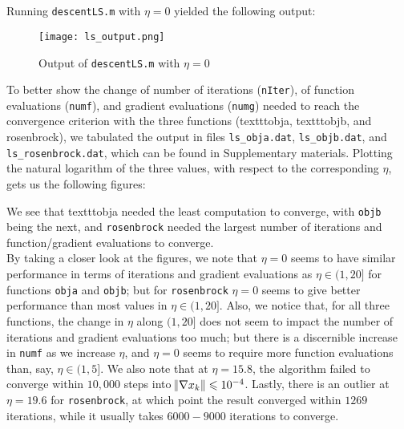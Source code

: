 \documentclass[11pt]{article}
\begin{document}
\section{}
Running \texttt{descentLS.m} with $\eta = 0$ yielded the following output:
\begin{figure}[h]
\centering
{\texttt{[image: ls\_output.png]}
\caption{Output of \texttt{descentLS.m} with $\eta=0$}}
\end{figure}
To better show the change of number of iterations (\texttt{nIter}), of function evaluations (\texttt{numf}), and gradient evaluations (\texttt{numg}) needed to reach the convergence criterion with the three functions (texttt{obja}, texttt{objb}, and {rosenbrock}), we tabulated the output in files \texttt{ls\_obja.dat}, \texttt{ls\_objb.dat}, and \texttt{ls\_rosenbrock.dat}, which can be found in Supplementary materials. Plotting the natural logarithm of the three values, with respect to the corresponding $\eta$, gets us the following figures:
\begin{figure}[ht]
\end{figure}
\begin{figure}[ht]
\end{figure}
\begin{figure}[ht]
\end{figure}
We see that texttt{obja} needed the least computation to converge, with \texttt{objb} being the next, and \texttt{rosenbrock} needed the largest number of iterations and function/gradient evaluations to converge.\\[0.4cm]
By taking a closer look at the figures, we note that $\eta=0$ seems to have similar performance in terms of iterations and gradient evaluations as $\eta\in(1,20]$ for functions \texttt{obja} and \texttt{objb}; but for \texttt{rosenbrock} $\eta=0$ seems to give better performance than most values in $\eta\in(1,20]$. Also, we notice that, for all three functions, the change in $\eta$ along $(1,20]$ does not seem to impact the number of iterations and gradient evaluations too much; but there is a discernible increase in \texttt{numf} as we increase $\eta$, and $\eta=0$ seems to require more function evaluations than, say, $\eta\in(1,5]$. We also note that at $\eta=15.8$, the algorithm failed to converge within $10,000$ steps into $\norm{\nabla{x_k}}\leqslant10^{-4}$. Lastly, there is an outlier at $\eta=19.6$ for \texttt{rosenbrock}, at which point the result converged within $1269$ iterations, while it usually takes $6000-9000$ iterations to converge.
\newpage
\end{document}
